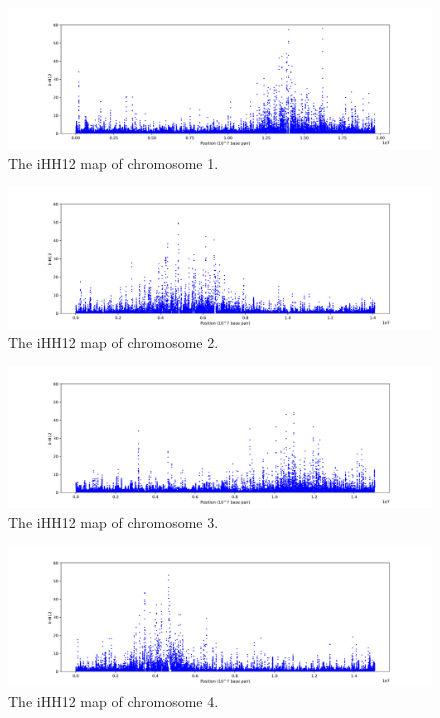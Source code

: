 \begin{figure}[h!]
    \centering
    \includegraphics[scale=0.4]{figs/Appx9.png}
    \caption{The iHH12 map of chromosome 1.}
    \label{fig:14}
\end{figure}

\begin{figure}[h!]
    \centering
    \includegraphics[scale=0.4]{figs/Appx10.png}
    \caption{The iHH12 map of chromosome 2.}
    \label{fig:15}
\end{figure}

\begin{figure}[h!]
    \centering
    \includegraphics[scale=0.4]{figs/Appx11.png}
    \caption{The iHH12 map of chromosome 3.}
    \label{fig:16}
\end{figure}

\begin{figure}[h!]
    \centering
    \includegraphics[scale=0.4]{figs/Appx12.png}
    \caption{The iHH12 map of chromosome 4.}
    \label{fig:17}
\end{figure}

